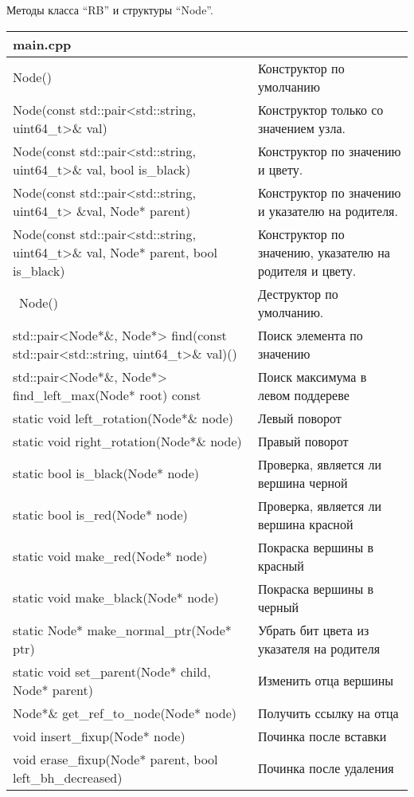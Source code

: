 Методы класса \enquote{RB} и структуры \enquote{Node}.
\begin{longtable}{|p{7.5cm}|p{7.5cm}|}
\hline
\rowcolor{lightgray}
\multicolumn{2}{|c|} {main.cpp}\\
\hline
Node()&Конструктор по умолчанию\\
\hline
Node(const std::pair<std::string, uint64\_t>\& val)&Конструктор только со значением узла.\\
\hline
Node(const std::pair<std::string, uint64\_t>\& val, bool is\_black)&Конструктор по значению и цвету.\\
\hline
Node(const std::pair<std::string, uint64\_t> \&val, Node* parent)&Конструктор по значению и указателю на родителя.\\
\hline
Node(const std::pair<std::string, uint64\_t>\& val, Node* parent, bool is\_black)&Конструктор по значению, указателю на родителя и цвету.\\
\hline
~Node()&Деструктор по умолчанию.\\
\hline
std::pair<Node*\&, Node*> find(const std::pair<std::string, uint64\_t>\& val)()&Поиск элемента по значению\\
\hline
std::pair<Node*\&, Node*> find\_left\_max(Node* root) const&Поиск максимума в левом поддереве\\
\hline
static void left\_rotation(Node*\& node)&Левый поворот\\
\hline
static void right\_rotation(Node*\& node)&Правый поворот\\
\hline
static bool is\_black(Node* node)&Проверка, является ли вершина черной\\
\hline
static bool is\_red(Node* node)&Проверка, является ли вершина красной\\
\hline
static void make\_red(Node* node)&Покраска вершины в красный\\
\hline
static void make\_black(Node* node)&Покраска вершины в черный\\
\hline
static Node* make\_normal\_ptr(Node* ptr)&Убрать бит цвета из указателя на родителя\\
\hline
static void set\_parent(Node* child, Node* parent)&Изменить отца вершины\\
\hline
Node*\& get\_ref\_to\_node(Node* node)&Получить ссылку на отца\\
\hline
void insert\_fixup(Node* node)&Починка после вставки\\
\hline
void erase\_fixup(Node* parent, bool left\_bh\_decreased)&Починка после удаления\\

\end{longtable}
